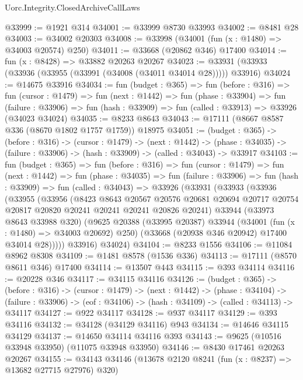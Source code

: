 \begin{lexlean}{Uorc.Integrity.ClosedArchiveCallLaws}
\begin{coremodule}
@33999 := @1921 @314
@34001 := @33999 @8730 @33993
@34002 := @8481 @28
@34003 := @34002 @20303
@34008 := @33998 (@34001 (fun (x : @1480) => @34003 @20574) @250)
@34011 := @33668 (@20862 @346) @17400
@34014 := fun (x : @8428) => @33882 @20263 @20267
@34023 := @33931 (@33933 (@33936 (@33955 (@33991 (@34008 (@34011 @34014 @28))))) @33916)
@34024 := @14675 @33916
@34034 := fun (budget : @365) =>
  fun (before : @316) =>
  fun (cursor : @1479) =>
  fun (next : @1442) =>
  fun (phase : @33904) =>
  fun (failure : @33906) => fun (hash : @33909) => fun (called : @33913) => @33926 (@34023 @34024)
@34035 := @8233 @8643
@34043 := @17111 (@8667 @8587 @336 (@8670 @1802 @1757 @1759)) @18975
@34051 := (budget : @365) ->
  (before : @316) ->
  (cursor : @1479) ->
  (next : @1442) ->
  (phase : @34035) -> (failure : @33906) -> (hash : @33909) -> (called : @34043) -> @33917
@34103 := fun (budget : @365) =>
  fun (before : @316) =>
  fun (cursor : @1479) =>
  fun (next : @1442) =>
  fun (phase : @34035) =>
  fun (failure : @33906) =>
  fun (hash : @33909) =>
  fun (called : @34043) =>
  @33926
    (@33931
      (@33933
        (@33936
          (@33955
            (@33956
              (@8423
                @8643
                @20567
                @20576
                @20681
                @20694
                @20717
                @20754
                @20817
                @20820
                @20241
                @20241
                @20241
                @20826
                @20241)
              @33944
              (@33973 @8643 @33988 @320)
              (@9625
                @20388
                (@33995 @20387)
                @33944
                (@34001 (fun (x : @1480) => @34003 @20692) @250)
                (@33668 (@20938 @346 @20942) @17400 @34014 @28)))))
        @33916)
      @34024)
@34104 := @8233 @1556
@34106 := @11084 @8962 @8308
@34109 := @1481 @8578 (@1536 @336)
@34113 := @17111 (@8570 @8611 @346) @17400
@34114 := @13507 @443
@34115 := @393 @34114
@34116 := @20228 @346
@34117 := @34115 @34116
@34126 := (budget : @365) ->
  (before : @316) ->
  (cursor : @1479) ->
  (next : @1442) ->
  (phase : @34104) ->
  (failure : @33906) -> (eof : @34106) -> (hash : @34109) -> (called : @34113) -> @34117
@34127 := @922 @34117
@34128 := @937 @34117
@34129 := @393 @34116
@34132 := @34128 (@34129 @34116) @943
@34134 := @14646 @34115 @34129
@34137 := @14650 @34114 @34116 @393
@34143 := @9625 (@10516 @33948 @33950) (@11075 @33948 @33950)
@34146 := @8430 @17461 @20263 @20267
@34155 := @34143 @34146 (@13678 @2120 @8241 (fun (x : @8237) => @13682 @27715 @27976) @320)

\end{coremodule}
\end{lexlean}
